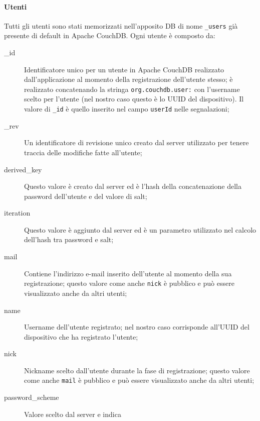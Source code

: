                 \paragraph{Utenti}
                Tutti gli utenti sono stati memorizzati nell'apposito DB di
                nome \texttt{\_users} già presente di default in Apache
                CouchDB\texttrademark{}. Ogni utente è composto da:
                \begin{description}
                    \item[\_id] Identificatore unico per un utente in Apache
                    CouchDB\texttrademark{} realizzato dall'applicazione al
                    momento della registrazione dell'utente stesso; è
                    realizzato concatenando la stringa
                    \texttt{org.couchdb.user:} con l'username scelto per
                    l'utente (nel nostro caso questo è lo UUID del dispositivo).
                    Il valore di \texttt{\_id} è quello inserito nel campo
                    \texttt{userId} nelle segnalazioni;
                    \item[\_rev] Un identificatore di revisione unico creato
                    dal server utilizzato per tenere traccia delle modifiche
                    fatte all'utente;
                    \item[derived\_key] Questo valore è creato dal server ed
                    è l'hash della concatenazione della password dell'utente e
                    del valore di salt;
                    \item[iteration] Questo valore è aggiunto dal server ed è
                    un parametro utilizzato nel calcolo dell'hash tra password
                    e salt;
                    \item[mail] Contiene l'indirizzo e-mail inserito
                    dell'utente al momento della sua registrazione; questo
                    valore come anche \texttt{nick} è pubblico e può essere
                    visualizzato anche da altri utenti;
                    \item[name] Username dell'utente registrato; nel nostro
                    caso corrisponde all'UUID del dispositivo che ha
                    registrato l'utente;
                    \item[nick] Nickname scelto dall'utente durante la fase di
                    registrazione; questo valore come anche \texttt{mail} è
                    pubblico e può essere visualizzato anche da altri utenti;
                    \item[password\_scheme] Valore scelto dal server e indica

\end{description}

